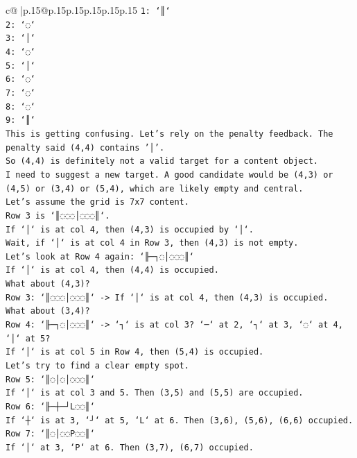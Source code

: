 \documentclass{article}
\begin{document}
{\begin{supertabular}{c@{$\;$}|p{.15\linewidth}@{}p{.15\linewidth}p{.15\linewidth}p{.15\linewidth}p{.15\linewidth}p{.15\linewidth}}
{{{\texttt{1: `║`} \\
\texttt{2: `◌`} \\
\texttt{3: `│`} \\
\texttt{4: `◌`} \\
\texttt{5: `│`} \\
\texttt{6: `◌`} \\
\texttt{7: `◌`} \\
\texttt{8: `◌`} \\
\texttt{9: `║`} \\
\texttt{This is getting confusing. Let's rely on the penalty feedback. The penalty said (4,4) contains '│'.} \\
\texttt{So (4,4) is definitely not a valid target for a content object.} \\
\texttt{I need to suggest a new target. A good candidate would be (4,3) or (4,5) or (3,4) or (5,4), which are likely empty and central.} \\
\texttt{Let's assume the grid is 7x7 content.} \\
\texttt{Row 3 is `║◌◌◌│◌◌◌║`.} \\
\texttt{If `│` is at col 4, then (4,3) is occupied by `│`.} \\
\texttt{Wait, if `│` is at col 4 in Row 3, then (4,3) is not empty.} \\
\texttt{Let's look at Row 4 again: `╟─┐◌│◌◌◌║`} \\
\texttt{If `│` is at col 4, then (4,4) is occupied.} \\
\texttt{What about (4,3)?} \\
\texttt{Row 3: `║◌◌◌│◌◌◌║` {-}> If `│` is at col 4, then (4,3) is occupied.} \\
\texttt{What about (3,4)?} \\
\texttt{Row 4: `╟─┐◌│◌◌◌║` {-}> `┐` is at col 3? `─` at 2, `┐` at 3, `◌` at 4, `│` at 5?} \\
\texttt{If `│` is at col 5 in Row 4, then (5,4) is occupied.} \\
\texttt{Let's try to find a clear empty spot.} \\
\texttt{Row 5: `║◌│◌│◌◌◌║`} \\
\texttt{If `│` is at col 3 and 5. Then (3,5) and (5,5) are occupied.} \\
\texttt{Row 6: `╟─┼─┘L◌◌║`} \\
\texttt{If `┼` is at 3, `┘` at 5, `L` at 6. Then (3,6), (5,6), (6,6) occupied.} \\
\texttt{Row 7: `║◌│◌◌P◌◌║`} \\
\texttt{If `│` at 3, `P` at 6. Then (3,7), (6,7) occupied.} \\
}}}
\end{supertabular}}
\end{document}
